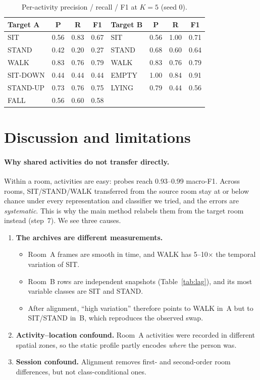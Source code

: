 \documentclass[11pt,a4paper]{article}
\begin{document}
\begin{table}[H]
\centering\small
\caption{Per-activity precision / recall / F1 at $K=5$ (seed 0).}
\label{tab:cm}
\begin{tabular}{lccc@{\hspace{1.2cm}}lccc}
\toprule
Target A & P & R & F1 & Target B & P & R & F1\\
\midrule
SIT & 0.56 & 0.83 & 0.67 & SIT & 0.56 & 1.00 & 0.71\\
STAND & 0.42 & 0.20 & 0.27 & STAND & 0.68 & 0.60 & 0.64\\
WALK & 0.83 & 0.76 & 0.79 & WALK & 0.83 & 0.76 & 0.79\\
SIT-DOWN & 0.44 & 0.44 & 0.44 & EMPTY & 1.00 & 0.84 & 0.91\\
STAND-UP & 0.73 & 0.76 & 0.75 & LYING & 0.79 & 0.44 & 0.56\\
FALL & 0.56 & 0.60 & 0.58 & & & & \\
\bottomrule
\end{tabular}
\end{table}

\section{Discussion and limitations}\label{sec:disc}

\paragraph{Why shared activities do not transfer directly.} Within a room, activities are easy: probes reach 0.93--0.99 macro-F1. Across rooms, SIT/STAND/WALK transferred from the source room stay at or below chance under every representation and classifier we tried, and the errors are \emph{systematic}. This is why the main method relabels them from the target room instead (step~7). We see three causes.
\begin{enumerate}
  \item \textbf{The archives are different measurements.}
  \begin{itemize}
    \item Room~A frames are smooth in time, and WALK has 5--10$\times$ the temporal variation of SIT.
    \item Room~B rows are independent snapshots (Table~\ref{tab:lag}), and its most variable classes are SIT and STAND.
    \item After alignment, ``high variation'' therefore points to WALK in~A but to SIT/STAND in~B, which reproduces the observed swap.
  \end{itemize}
  \item \textbf{Activity--location confound.} Room~A activities were recorded in different spatial zones, so the static profile partly encodes \emph{where} the person was.
  \item \textbf{Session confound.} Alignment removes first- and second-order room differences, but not class-conditional ones.
\end{enumerate}
\end{document}

